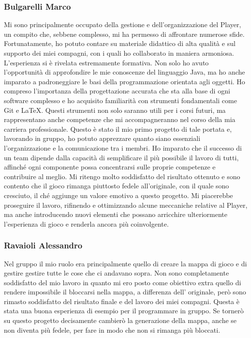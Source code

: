 \documentclass{report}
\begin{document}
\subsubsection{Bulgarelli Marco}
Mi sono principalmente occupato della gestione e dell’organizzazione del Player, un compito che, sebbene complesso, mi ha permesso di affrontare numerose sfide. Fortunatamente, ho potuto contare su materiale didattico di alta qualità e sul supporto dei miei compagni, con i quali ho collaborato in maniera armoniosa. \newline
L’esperienza si è rivelata estremamente formativa. Non solo ho avuto l’opportunità di approfondire le mie conoscenze del linguaggio Java, ma ho anche imparato a padroneggiare le basi della programmazione orientata agli oggetti. Ho compreso l’importanza della progettazione accurata che sta alla base di ogni software complesso 
e ho acquisito familiarità con strumenti fondamentali come Git e LaTeX. Questi strumenti non solo saranno utili per i corsi futuri, ma rappresentano anche competenze che mi accompagneranno nel corso della mia carriera professionale. \newline
Questo è stato il mio primo progetto di tale portata e, lavorando in gruppo, ho potuto apprezzare quanto siano essenziali l’organizzazione e la comunicazione tra i membri. Ho imparato che il successo di un team dipende dalla capacità di semplificare il più possibile il lavoro di tutti, affinché ogni componente possa concentrarsi 
sulle proprie competenze e contribuire al meglio. \newline
Mi ritengo molto soddisfatto del risultato ottenuto e sono contento che il gioco rimanga piuttosto fedele all’originale, con il quale sono cresciuto, il ché aggiunge un valore emotivo a questo progetto. Mi piacerebbe proseguire il lavoro, rifinendo e ottimizzando alcune meccaniche relative al Player, ma anche introducendo nuovi 
elementi che possano arricchire ulteriormente l’esperienza di gioco e renderla ancora più coinvolgente.

\subsubsection{Ravaioli Alessandro}
Nel gruppo il mio ruolo era principalmente quello di creare la mappa di gioco e di gestire gestire tutte le cose che ci andavano sopra.
%
Non sono completamente soddisfatto del mio lavoro in quanto mi ero posto come obiettivo extra quello di rendere impossibile il bloccarsi nella mappa, a differenza dell' originale,
%
però sono rimasto soddisfatto del risultato finale e del lavoro dei miei compagni. Questa è stata una buona esperienza di esempio per il programmare in gruppo. 
%
Se tornerò su questo progetto decisamente cambierò la generazione della mappa, anche se non diventa più fedele, per fare in modo che non si rimanga più bloccati.
\end{document}

